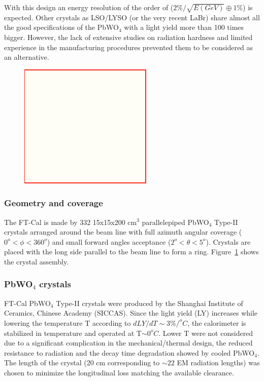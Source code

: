 With this design
 an energy resolution of the order of
($2\% /\sqrt{E(GeV)} \oplus 1\%$) is expected.
Other crystals as LSO/LYSO (or the very recent LaBr) share almost all the good specifications of the PbWO$_4$ with a light yield more than 100 times bigger. However, the lack of extensive studies on radiation hardness and limited experience in the manufacturing procedures prevented them to be considered as an alternative.

\begin{figure}[th!]
\centering 
\includegraphics[width=0.85\columnwidth]{fig/dummy.png} 
\caption{} 
\label{fig:ft-cal-geometry} 
\end{figure}

\subsubsection{Geometry and coverage}
The FT-Cal is made by 332 15x15x200 cm$^3$ parallelepiped PbWO$_4$ Type-II crystals arranged around the beam line  with full azimuth angular coverage ($0^o<\phi<360^o$)   and small forward angles  acceptance ($2^o<\theta<5^o$). Crystals are placed with the long side parallel to the beam line to form a ring. Figure~\ref{fig:ft-cal-geometry} shows the crystal assembly. 

\subsubsection{PbWO$_4$ crystals}
FT-Cal PbWO$_4$ Type-II crystals were produced by the Shanghai Institute of Ceramics, Chinese Academy (SICCAS). Since the light yield (LY) increases while lowering the temperature T according to $dLY/dT \sim 3\%/^oC$, the calorimeter is stabilized in temperature and operated at T$\sim 0 ^oC$. Lower T were not considered due to a significant complication in the mechanical/thermal design,  the reduced resistance to radiation  and the decay time degradation showed by cooled PbWO$_4$.
The length of the crystal (20 cm corresponding to $\sim22$ EM radiation lengths) was chosen to minimize the longitudinal loss matching the available clearance.

